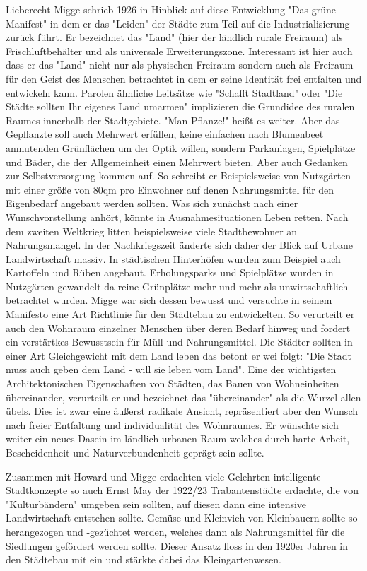 \documentclass{scrartcl}
\begin{document}
Lieberecht Migge schrieb 1926 in Hinblick auf diese Entwicklung "Das grüne Manifest" in dem er das "Leiden" der Städte zum Teil auf die Industrialisierung zurück führt. Er bezeichnet das "Land" (hier der ländlich rurale Freiraum) als Frischluftbehälter und als universale Erweiterungszone. Interessant ist hier auch dass er das "Land" nicht nur als physischen Freiraum sondern auch als Freiraum für den Geist des Menschen betrachtet in dem er seine Identität frei entfalten und entwickeln kann. Parolen ähnliche Leitsätze wie "Schafft Stadtland" oder "Die Städte sollten Ihr eigenes Land umarmen" implizieren die Grundidee des ruralen Raumes innerhalb der Stadtgebiete. "Man Pflanze!" heißt es weiter. Aber das Gepflanzte soll auch Mehrwert erfüllen, keine einfachen nach Blumenbeet anmutenden Grünflächen um der Optik willen, sondern Parkanlagen, Spielplätze und Bäder, die der Allgemeinheit einen Mehrwert bieten. Aber auch Gedanken zur Selbstversorgung kommen auf. So schreibt er Beispielsweise von Nutzgärten mit einer größe von 80qm pro Einwohner auf denen Nahrungsmittel für den Eigenbedarf angebaut werden sollten. Was sich zunächst nach einer Wunschvorstellung anhört, könnte in Ausnahmesituationen Leben retten. Nach dem zweiten Weltkrieg litten beispielsweise viele Stadtbewohner an Nahrungsmangel. In der Nachkriegszeit änderte sich daher der Blick auf Urbane Landwirtschaft massiv. In städtischen Hinterhöfen wurden zum Beispiel auch Kartoffeln und Rüben angebaut. Erholungsparks und Spielplätze wurden in Nutzgärten gewandelt da reine Grünplätze mehr und mehr als unwirtschaftlich betrachtet wurden. Migge war sich dessen bewusst und versuchte in seinem Manifesto eine Art Richtlinie für den Städtebau zu entwickelten. So verurteilt er auch den Wohnraum einzelner Menschen über deren Bedarf hinweg und fordert ein verstärtkes Bewusstsein für Müll und Nahrungsmittel. Die Städter sollten in einer Art Gleichgewicht mit dem Land leben das betont er wei folgt: "Die Stadt muss auch geben dem Land - will sie leben vom Land". Eine der wichtigsten Architektonischen Eigenschaften von Städten, das Bauen von Wohneinheiten übereinander, verurteilt er und bezeichnet das "übereinander" als die Wurzel allen übels. Dies ist zwar eine äußerst radikale Ansicht, repräsentiert aber den Wunsch nach freier Entfaltung und individualität des Wohnraumes. Er wünschte sich weiter ein neues Dasein im ländlich urbanen Raum welches durch harte Arbeit, Bescheidenheit und Naturverbundenheit geprägt sein sollte.

Zusammen mit Howard und Migge erdachten viele Gelehrten intelligente Stadtkonzepte so auch Ernst May der 1922/23 Trabantenstädte erdachte, die von "Kulturbändern" umgeben sein sollten, auf diesen dann eine intensive Landwirtschaft entstehen sollte. Gemüse und Kleinvieh von Kleinbauern sollte so herangezogen und -gezüchtet werden, welches dann als Nahrungsmittel für die Siedlungen gefördert werden sollte. Dieser Ansatz floss in den 1920er Jahren in den Städtebau mit ein und stärkte dabei das Kleingartenwesen.
\end{document}
